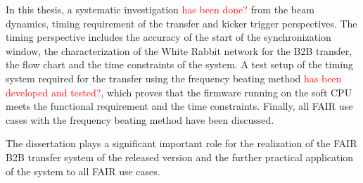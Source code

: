  
In this thesis, a systematic investigation \textcolor{red}{has been done?} from the beam dynamics, timing requirement of the transfer and kicker trigger perspectives. The timing perspective includes the accuracy of the start of the synchronization window, the characterization of the White Rabbit network for the B2B transfer, the flow chart and the time constraints of the system. A test setup of the timing system required for the transfer using the frequency beating method \textcolor{red}{has been developed and tested?}, which proves that the firmware running on the soft CPU meets the functional requirement and the time constraints. Finally, all FAIR use cases with the frequency beating method have been discussed.

The dissertation plays a significant important role for the realization of the FAIR B2B transfer system of the released version and the further practical application of the system to all FAIR use cases.  



